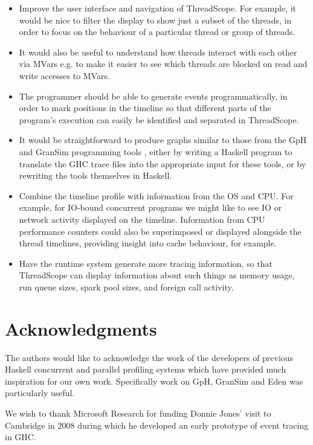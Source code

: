 \documentclass[twocolumn,9pt]{sigplanconf}
\newcommand{\codef}[1]{{\fontfamily{cmss}\small#1}}
\let\cite=\citep
\begin{document}
\begin{itemize}
\item Improve the user interface and navigation of ThreadScope.  For
  example, it would be nice to filter the display to show just a
  subset of the threads, in order to focus on the behaviour of a
  particular thread or group of threads.

\item It would also be useful to understand how threads interact with each 
   other via \codef{MVars} e.g. to make it easier to see which 
   threads are blocked on read and write accesses to \codef{MVar}s.

\item The programmer should be able to generate events
  programmatically, in order to mark positions in the timeline so that
  different parts of the program's execution can easily be identified
  and separated in ThreadScope.

\item It would be straightforward to produce graphs similar to those
  from the GpH and GranSim programming tools \cite{trinder:02,loidl},
  either by writing a Haskell program to translate the GHC trace files
  into the appropriate input for these tools, or by rewriting the
  tools themselves in Haskell.

\item Combine the timeline profile with information from the OS and
  CPU.  For example, for IO-bound concurrent programs we might like to
  see IO or network activity displayed on the timeline.  Information
  from CPU performance counters could also be superimposed or
  displayed alongside the thread timelines, providing insight into
  cache behaviour, for example.

\item Have the runtime system generate more tracing information, so
  that ThreadScope can display information about such things as memory
  usage, run queue sizes, spark pool sizes, and foreign call activity.
\end{itemize}

\section*{Acknowledgments}

The authors would like to acknowledge the work of the developers
of previous Haskell concurrent and parallel profiling systems
which have provided much inspiration for our own work. Specifically
work on GpH, GranSim and Eden was particularly useful.

We wish to thank Microsoft Research for funding Donnie Jones' visit to
Cambridge in 2008 during which he developed an early prototype of
event tracing in GHC.

{\small


}
\end{document}
